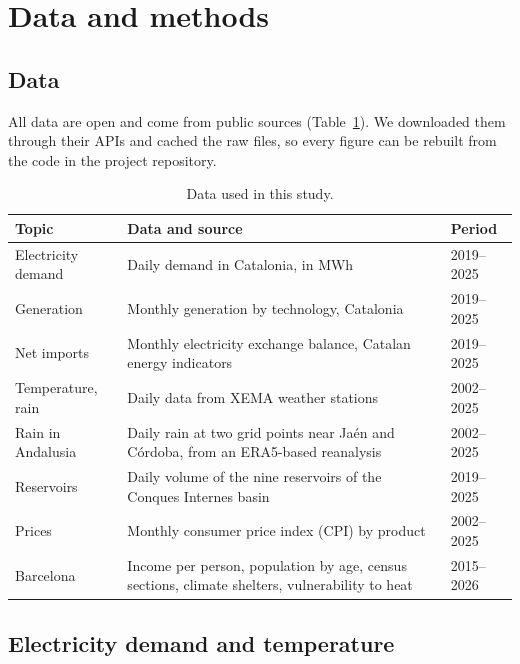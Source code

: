 \documentclass[11pt,a4paper]{article}
\begin{document}
\section{Data and methods}

\subsection{Data}

All data are open and come from public sources (Table~\ref{tab:data}). We downloaded them through their APIs and cached the raw files, so every figure can be rebuilt from the code in the project repository.

\begin{table}[H]
\centering
\small
\begin{tabularx}{\linewidth}{@{}l X l@{}}
\toprule
Topic & Data and source & Period\\
\midrule
Electricity demand & Daily demand in Catalonia, in MWh \citep{demand} & 2019--2025\\
Generation & Monthly generation by technology, Catalonia \citep{redata} & 2019--2025\\
Net imports & Monthly electricity exchange balance, Catalan energy indicators \citep{indicators} & 2019--2025\\
Temperature, rain & Daily data from XEMA weather stations \citep{xema} & 2002--2025\\
Rain in Andalusia & Daily rain at two grid points near Ja\'en and C\'ordoba, from an ERA5-based reanalysis \citep{openmeteo,era5} & 2002--2025\\
Reservoirs & Daily volume of the nine reservoirs of the Conques Internes basin \citep{aca} & 2019--2025\\
Prices & Monthly consumer price index (CPI) by product \citep{ine} & 2002--2025\\
Barcelona & Income per person, population by age, census sections, climate shelters, vulnerability to heat \citep{bcn} & 2015--2026\\
\bottomrule
\end{tabularx}
\caption{Data used in this study.}
\label{tab:data}
\end{table}

\subsection{Electricity demand and temperature}
\end{document}
